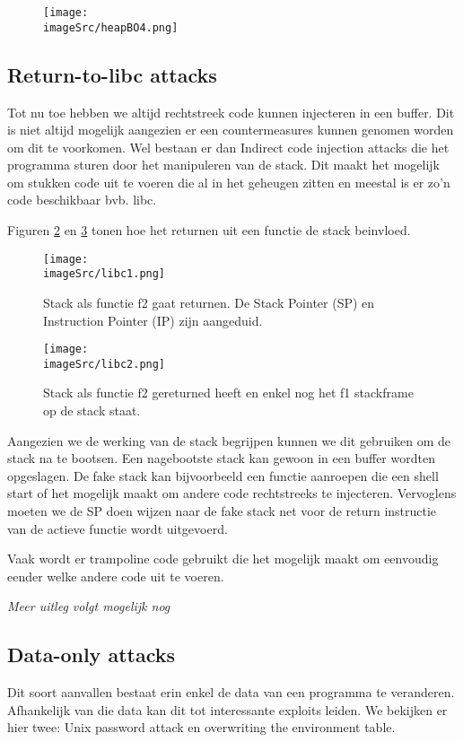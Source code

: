 \documentclass[../main.tex]{subfiles}
\begin{document}
\begin{figure}
\centering
\texttt{[image: \\imageSrc/heapBO4.png]}
\caption{}
\label{f:heapBO4}
\end{figure}
\subsection{Return-to-libc attacks}
Tot nu toe hebben we altijd rechtstreek code kunnen injecteren in een buffer.
Dit is niet altijd mogelijk aangezien er een countermeasures kunnen genomen worden om dit te voorkomen.
Wel bestaan er dan Indirect code injection attacks die het programma sturen door het manipuleren van de stack.
Dit maakt het mogelijk om stukken code uit te voeren die al in het geheugen zitten en meestal is er zo'n code beschikbaar bvb. libc.

Figuren \ref{f:libc1} en \ref{f:libc2} tonen hoe het returnen uit een functie de stack beinvloed.
\begin{figure}
\centering
\texttt{[image: \\imageSrc/libc1.png]}
\caption{Stack als functie f2 gaat returnen. De Stack Pointer (SP) en Instruction Pointer (IP) zijn aangeduid.}
\label{f:libc1}
\end{figure}

\begin{figure}
\centering
\texttt{[image: \\imageSrc/libc2.png]}
\caption{Stack als functie f2 gereturned heeft en enkel nog het f1 stackframe op de stack staat.}
\label{f:libc2}
\end{figure}

Aangezien we de werking van de stack begrijpen kunnen we dit gebruiken om de stack na te bootsen.
Een nagebootste stack kan gewoon in een buffer wordten opgeslagen.
De fake stack kan bijvoorbeeld een functie aanroepen die een shell start of het mogelijk maakt om andere code rechtstreeks te injecteren.
Vervoglens moeten we de SP doen wijzen naar de fake stack net voor de return instructie van de actieve functie wordt uitgevoerd.

Vaak wordt er trampoline code gebruikt die het mogelijk maakt om eenvoudig eender welke andere code uit te voeren.

\textit{Meer uitleg volgt mogelijk nog}



\subsection{Data-only attacks}
Dit soort aanvallen bestaat erin enkel de data van een programma te veranderen.
Afhankelijk van die data kan dit tot interessante exploits leiden.
We bekijken er hier twee: Unix password attack en overwriting the environment table.
\end{document}
